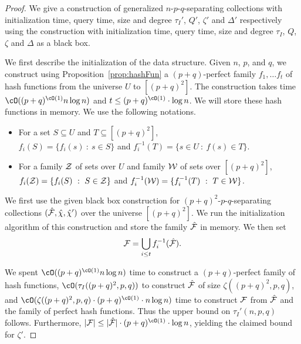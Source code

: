 \begin{proof}
We give a construction of generalized $n$-$p$-$q$-separating collections with initialization time, query time, size and degree $\tau_I'$, ${Q}'$, $\zeta'$ and $\Delta'$ respectively using the 
construction with initialization time, query time, size and degree $\tau_I$, ${Q}$, $\zeta$ and $\Delta$ as a black box. 
 
We first describe the initialization of the data structure. Given $n$, $p$, and $q$, we construct using Proposition~\ref{prop:hashFun} a $(p+q)$-perfect family $f_1, \ldots f_t$ 
of hash functions from the universe $U$ to $[(p+q)^2]$. The construction takes time $\cO((p+q)^{\cO(1)}n \log n)$ and $t \leq  (p+q)^{\cO(1)} \cdot \log n$. 
We will store these hash functions in memory. We use the following notations.
\begin{itemize}
 \item For a set $S \subseteq U$ and $T\subseteq [(p+q)^2]$,  \\ $f_i(S)=\{f_i(s) ~:~ s \in S\}$ and $f_i^{-1}(T)=\{s \in U ~:~ f(s) \in T\}$. 
 \item For a family ${\cal Z}$ of sets over $U$ and family ${\cal W}$ of sets over $[(p+q)^2]$,\\ $f_i({\cal Z})=\{f_i(S) ~:~ S \in {\cal Z}\}$ and $f_i^{-1}({\cal W})=\{f_i^{-1}(T) ~:~ T \in {\cal W}\}$.
\end{itemize}


 We first use the given black box construction for $(p+q)^2$-$p$-$q$-separating collections $(\hat{\cal F}, \hat{\chi},\hat{\chi}')$ over the universe $[(p+q)^2]$. 
We run the initialization algorithm of this construction and store the family $\hat{\cal F}$ in memory. We then set
\begin{align*} {\cal F} = \bigcup_{i\leq t} f_i^{-1}(\hat{\cal F}). \end{align*}

 We spent $\cO((p+q)^{\cO(1)}n \log n)$ time to construct a $(p+q)$-perfect family of hash functions,  $\cO(\tau_I((p+q)^2,p,q))$ to construct $\hat{\cal F}$ of size $\zeta((p+q)^2,p,q)$, 
and $\cO(\zeta((p+q)^2,p,q) \cdot (p+q)^{\cO(1)} \cdot n \log n)$ time to construct ${\cal F}$ from $\hat{\cal F}$ and the family of perfect hash functions. 
Thus the upper bound on $\tau_I'(n,p,q)$ follows. Furthermore,  $|{\cal F}| \leq |\hat{\cal F}| \cdot  (p+q)^{\cO(1)} \cdot \log n$, yielding the claimed bound for $\zeta'$.
 

\end{proof}
